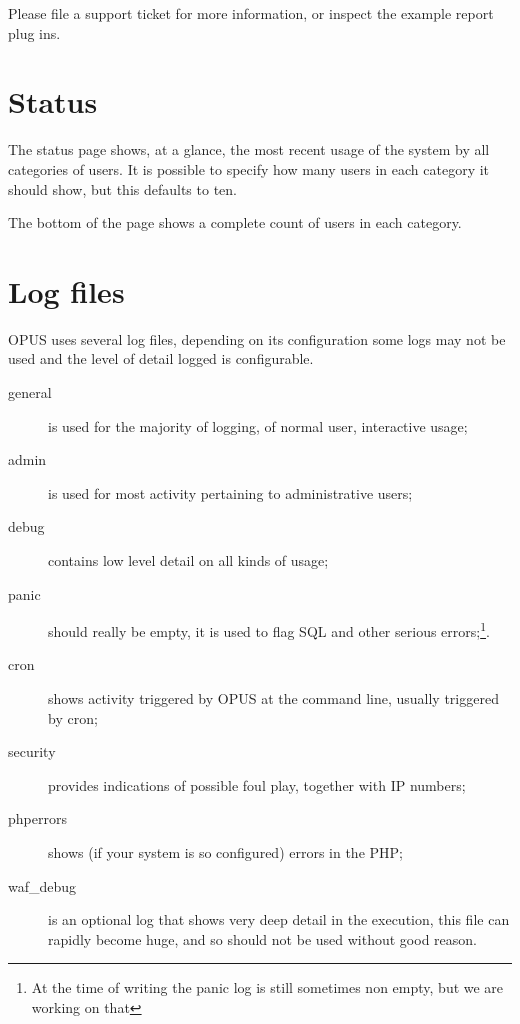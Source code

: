 \documentclass[12 pt]{book}
\begin{document}
Please file a support ticket for more information, or inspect the example report
plug ins.

\section{Status}

The status page shows, at a glance, the most recent usage of the system by all categories of
users. It is possible to specify how many users in each category it should show, but this defaults to ten.

The bottom of the page shows a complete count of users in each category.


\section{Log files}

OPUS uses several log files, depending on its configuration some logs may not be used and
the level of detail logged is configurable.

\begin{description}
  \item[general] is used for the majority of logging, of normal user, interactive usage;
  \item[admin] is used for most activity pertaining to administrative users;
  \item[debug] contains low level detail on all kinds of usage;
  \item[panic] should really be empty, it is used to flag SQL and other serious errors;\footnote{At the time of writing the panic log is still sometimes non empty, but we are working on that}.
  \item[cron] shows activity triggered by OPUS at the command line, usually triggered by cron;
  \item[security] provides indications of possible foul play, together with IP numbers;
  \item[phperrors] shows (if your system is so configured) errors in the PHP;
  \item[waf\_debug] is an optional log that shows very deep detail in the execution, this file can rapidly become huge, and so should not be used without good reason.
\end{description}
\end{document}
